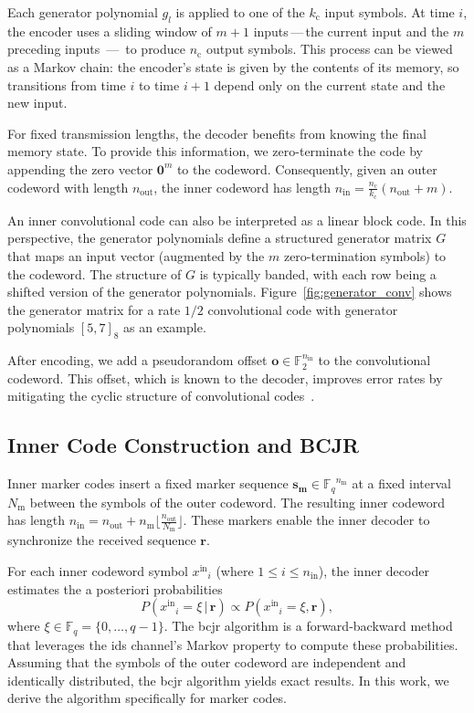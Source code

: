 \documentclass[conference,letterpaperu]{IEEEtran}
\newcommand{\vv}{\ensuremath{\,\vert\,}}
\newcommand{\yinIx}{\ensuremath{x^{\text{in}}}}
\newcommand{\Yval}{\ensuremath{\xi}}
\newcommand{\nin}{\ensuremath{n_{\text{in}}}}
\newcommand{\nout}{\ensuremath{n_{\text{out}}}}
\newcommand{\rec}{\ensuremath{\bm{r}}}
\newcommand{\marker}{\ensuremath{\bm{s_{\text{m}}}}}
\newcommand{\markerFreq}{\ensuremath{N_{\text{m}}}}
\newcommand{\convn}{\ensuremath{n_\text{c}}}
\newcommand{\convk}{\ensuremath{k_\text{c}}}
\newcommand{\alphabet}{\ensuremath{\mathbb{F}_q}}
\newcommand{\offset}{\ensuremath{\bm{o}}}
\begin{document}
Each generator polynomial $g_l$ is applied to one of the $\convk$ input symbols. At time $i$, the encoder uses a sliding window of $m +1$ inputs\,---\,the current input and the $m$ preceding inputs \,---\, to produce $\convn$ output symbols. This process can be viewed as a Markov chain: the encoder's state is given by the contents of its memory, so transitions from time $i$ to time $i+1$ depend only on the current state and the new input.

For fixed transmission lengths, the decoder benefits from knowing the final memory state. To provide this information, we zero-terminate the code by appending the zero vector $\bm{0}^m$ to the codeword. Consequently, given an outer codeword with length $\nout$, the inner codeword has length $\nin = \frac{\convn}{\convk}(\nout + m)$. 

An inner convolutional code can also be interpreted as a linear block code. In this perspective, the generator polynomials define a structured generator matrix $G$ that maps an input vector (augmented by the $m$ zero-termination symbols) to the codeword. The structure of $G$ is typically banded, with each row being a shifted version of the generator polynomials. Figure~\ref{fig:generator_conv} shows the generator matrix for a rate $1/2$ convolutional code with generator polynomials $[5, 7]_8$ as an example. 

After encoding, we add a pseudorandom offset $\offset \in \mathbb{F}_2^{\nin}$ to the convolutional codeword. This offset, which is known to the decoder, improves error rates by mitigating the cyclic structure of convolutional codes~\cite{buttigiegImprovedBitError2015}.
 
\subsection{Inner Code Construction and BCJR} 
 \label{sec:bgMarkerCodesBCJR}

Inner marker codes insert a fixed marker sequence \( \marker \in \alphabet^{n_{\text{m}}} \) at a fixed interval \( \markerFreq \) between the symbols of the outer codeword. The resulting inner codeword has length \( \nin = \nout + n_{\text{m}} \lfloor\frac{\nout}{\markerFreq}\rfloor\). These markers enable the inner decoder to synchronize the received sequence $\rec$.

For each inner codeword symbol $\yinIx_i$ (where $1 \leq i \leq \nin$), the inner decoder estimates the a posteriori probabilities
\begin{equation}
\label{eq:bgBCJRAPosterioriProbabilities}
P(\yinIx_i = \Yval \vv \rec)  \propto P(\yinIx_i = \Yval, \rec),
\end{equation}
where $\Yval \in \alphabet = \{0, \ldots, q-1\}$. 
The \ac{bcjr} algorithm is a forward-backward method that leverages the \ac{ids} channel's Markov property to compute these probabilities. Assuming that the symbols of the outer codeword are independent and identically distributed, the \ac{bcjr} algorithm yields exact results. In this work, we derive the algorithm specifically for marker codes.
\end{document}
